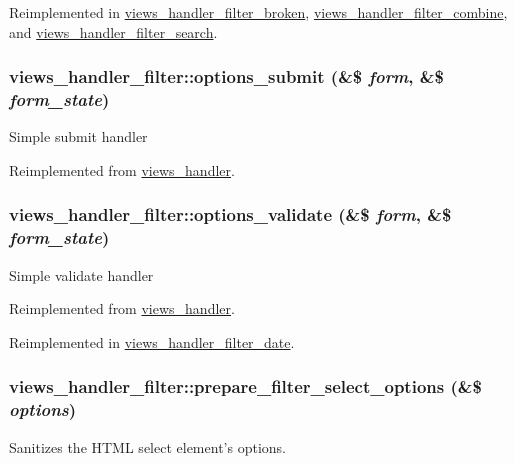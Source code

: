 Reimplemented in \hyperlink{classviews__handler__filter__broken_a51fc714b7aec668a035da8dfb4b4a69a}{views\_\-handler\_\-filter\_\-broken}, \hyperlink{classviews__handler__filter__combine_ab9cd16cf6ee4450ea0b20ab20ebb920c}{views\_\-handler\_\-filter\_\-combine}, and \hyperlink{classviews__handler__filter__search_ada5367d9347c96ba96de10ed22ab7ea0}{views\_\-handler\_\-filter\_\-search}.\hypertarget{classviews__handler__filter_ad93c8118dcd40fc5194a806e2986a300}{
\subsubsection[{options\_\-submit}]{\setlength{\rightskip}{0pt plus 5cm}views\_\-handler\_\-filter::options\_\-submit (\&\$ {\em form}, \/  \&\$ {\em form\_\-state})}}
\label{classviews__handler__filter_ad93c8118dcd40fc5194a806e2986a300}
Simple submit handler 

Reimplemented from \hyperlink{classviews__handler_abb55e97dbb1e634b95a1cc9ea836d6e8}{views\_\-handler}.\hypertarget{classviews__handler__filter_a1156751e912662ce47ad680cbe2c03a3}{
\subsubsection[{options\_\-validate}]{\setlength{\rightskip}{0pt plus 5cm}views\_\-handler\_\-filter::options\_\-validate (\&\$ {\em form}, \/  \&\$ {\em form\_\-state})}}
\label{classviews__handler__filter_a1156751e912662ce47ad680cbe2c03a3}
Simple validate handler 

Reimplemented from \hyperlink{classviews__handler_a831c00b8cd3c667e25db014a3413273c}{views\_\-handler}.

Reimplemented in \hyperlink{classviews__handler__filter__date_a6d4e05f04a0f9ea5663f165777f54003}{views\_\-handler\_\-filter\_\-date}.\hypertarget{classviews__handler__filter_a818702497fa12bbcbeaac3403337f924}{
\subsubsection[{prepare\_\-filter\_\-select\_\-options}]{\setlength{\rightskip}{0pt plus 5cm}views\_\-handler\_\-filter::prepare\_\-filter\_\-select\_\-options (\&\$ {\em options})}}
\label{classviews__handler__filter_a818702497fa12bbcbeaac3403337f924}
Sanitizes the HTML select element's options.


